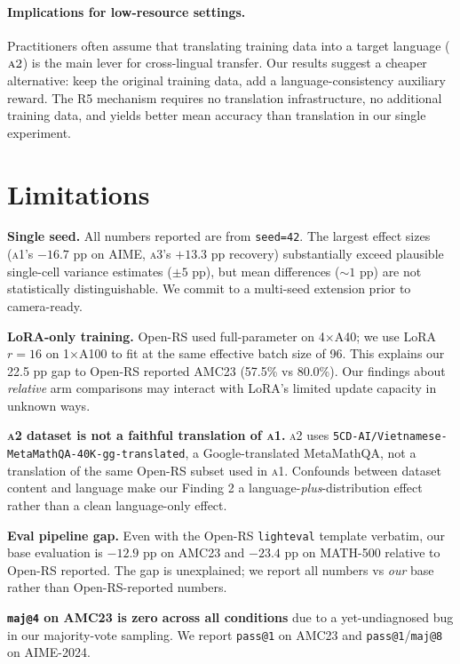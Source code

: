\documentclass[11pt]{article}
\newcommand{\armA}{\textsc{a1}}
\newcommand{\armB}{\textsc{a2}}
\newcommand{\armC}{\textsc{a3}}
\begin{document}
\paragraph{Implications for low-resource settings.}
Practitioners often assume that translating training data into a target language
($\armB$) is the main lever for cross-lingual transfer. Our results suggest a
cheaper alternative: keep the original training data, add a language-consistency
auxiliary reward. The R5 mechanism requires no translation infrastructure,
no additional training data, and yields better mean accuracy than translation
in our single experiment.

\section{Limitations}
\label{sec:limitations}
\textbf{Single seed.} All numbers reported are from \texttt{seed=42}. The largest
effect sizes (\armA{}'s $-16.7$ pp on AIME, \armC{}'s $+13.3$ pp recovery)
substantially exceed plausible single-cell variance estimates ($\pm 5$ pp), but
mean differences ($\sim 1$ pp) are not statistically distinguishable. We commit
to a multi-seed extension prior to camera-ready.

\textbf{LoRA-only training.} Open-RS used full-parameter on 4$\times$A40; we use
LoRA $r{=}16$ on 1$\times$A100 to fit at the same effective batch size of 96.
This explains our 22.5 pp gap to Open-RS reported AMC23 (57.5\% vs 80.0\%).
Our findings about \emph{relative} arm comparisons may interact with LoRA's
limited update capacity in unknown ways.

\textbf{\armB{} dataset is not a faithful translation of \armA{}.} \armB{} uses
\texttt{5CD-AI/Vietnamese-MetaMathQA-40K-gg-translated}, a Google-translated
MetaMathQA, not a translation of the same Open-RS subset used in \armA{}.
Confounds between dataset content and language make our Finding 2 a
language-\emph{plus}-distribution effect rather than a clean language-only effect.

\textbf{Eval pipeline gap.} Even with the Open-RS \texttt{lighteval} template
verbatim, our base evaluation is $-12.9$ pp on AMC23 and $-23.4$ pp on MATH-500
relative to Open-RS reported. The gap is unexplained; we report all numbers vs
\emph{our} base rather than Open-RS-reported numbers.

\textbf{\texttt{maj@4} on AMC23 is zero across all conditions} due to a
yet-undiagnosed bug in our majority-vote sampling. We report \texttt{pass@1} on
AMC23 and \texttt{pass@1}/\texttt{maj@8} on AIME-2024.
\end{document}
